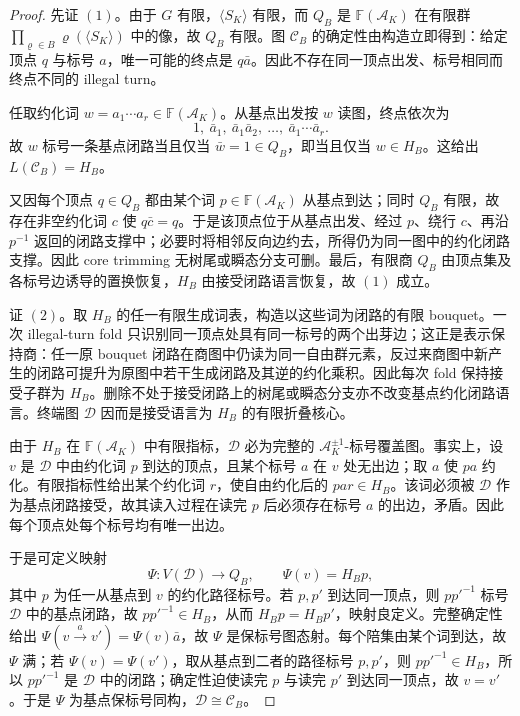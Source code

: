 \begin{proof}
先证 \((1)\)。由于 \(G\) 有限，\(\langle S_K\rangle\) 有限，而 \(Q_B\) 是 \(\mathbb F(\mathcal A_K)\) 在有限群 \(\prod_{\varrho\in B}\varrho(\langle S_K\rangle)\) 中的像，故 \(Q_B\) 有限。图 \(\mathscr C_B\) 的确定性由构造立即得到：给定顶点 \(q\) 与标号 \(a\)，唯一可能的终点是 \(q\bar a\)。因此不存在同一顶点出发、标号相同而终点不同的 illegal turn。

任取约化词 \(w=a_1\cdots a_r\in\mathbb F(\mathcal A_K)\)。从基点出发按 \(w\) 读图，终点依次为
\[
1,\ \bar a_1,\ \bar a_1\bar a_2,\ \ldots,\ \bar a_1\cdots\bar a_r.
\]
故 \(w\) 标号一条基点闭路当且仅当 \(\bar w=1\in Q_B\)，即当且仅当 \(w\in H_B\)。这给出 \(L(\mathscr C_B)=H_B\)。

又因每个顶点 \(q\in Q_B\) 都由某个词 \(p\in\mathbb F(\mathcal A_K)\) 从基点到达；同时 \(Q_B\) 有限，故存在非空约化词 \(c\) 使 \(q\bar c=q\)。于是该顶点位于从基点出发、经过 \(p\)、绕行 \(c\)、再沿 \(p^{-1}\) 返回的闭路支撑中；必要时将相邻反向边约去，所得仍为同一图中的约化闭路支撑。因此 core trimming 无树尾或瞬态分支可删。最后，有限商 \(Q_B\) 由顶点集及各标号边诱导的置换恢复，\(H_B\) 由接受闭路语言恢复，故 \((1)\) 成立。

证 \((2)\)。取 \(H_B\) 的任一有限生成词表，构造以这些词为闭路的有限 bouquet。一次 illegal-turn fold 只识别同一顶点处具有同一标号的两个出芽边；这正是表示保持商：任一原 bouquet 闭路在商图中仍读为同一自由群元素，反过来商图中新产生的闭路可提升为原图中若干生成闭路及其逆的约化乘积。因此每次 fold 保持接受子群为 \(H_B\)。删除不处于接受闭路上的树尾或瞬态分支亦不改变基点约化闭路语言。终端图 \(\mathscr D\) 因而是接受语言为 \(H_B\) 的有限折叠核心。

由于 \(H_B\) 在 \(\mathbb F(\mathcal A_K)\) 中有限指标，\(\mathscr D\) 必为完整的 \(\mathcal A_K^{\pm1}\)-标号覆盖图。事实上，设 \(v\) 是 \(\mathscr D\) 中由约化词 \(p\) 到达的顶点，且某个标号 \(a\) 在 \(v\) 处无出边；取 \(a\) 使 \(pa\) 约化。有限指标性给出某个约化词 \(r\)，使自由约化后的 \(par\in H_B\)。该词必须被 \(\mathscr D\) 作为基点闭路接受，故其读入过程在读完 \(p\) 后必须存在标号 \(a\) 的出边，矛盾。因此每个顶点处每个标号均有唯一出边。

于是可定义映射
\[
\Psi:V(\mathscr D)\longrightarrow Q_B,\qquad
\Psi(v)=H_B p,
\]
其中 \(p\) 为任一从基点到 \(v\) 的约化路径标号。若 \(p,p'\) 到达同一顶点，则 \(pp'^{-1}\) 标号 \(\mathscr D\) 中的基点闭路，故 \(pp'^{-1}\in H_B\)，从而 \(H_Bp=H_Bp'\)，映射良定义。完整确定性给出 \(\Psi(v\xrightarrow{a}v')=\Psi(v)\bar a\)，故 \(\Psi\) 是保标号图态射。每个陪集由某个词到达，故 \(\Psi\) 满；若 \(\Psi(v)=\Psi(v')\)，取从基点到二者的路径标号 \(p,p'\)，则 \(pp'^{-1}\in H_B\)，所以 \(pp'^{-1}\) 是 \(\mathscr D\) 中的闭路；确定性迫使读完 \(p\) 与读完 \(p'\) 到达同一顶点，故 \(v=v'\)。于是 \(\Psi\) 为基点保标号同构，\(\mathscr D\cong\mathscr C_B\)。


\end{proof}
